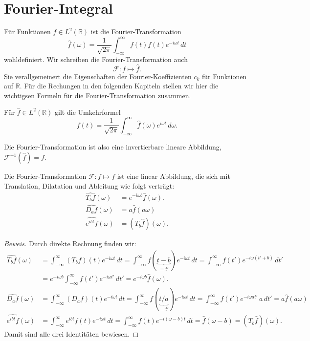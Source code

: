%
%
%
\section{Fourier-Integral
\label{section:fourier-integral}}
Für Funktionen $f\in L^2(\mathbb R)$ ist die Fourier-Transformation
\[
\hat{f}(\omega)
=
\frac{1}{\sqrt{2\pi}}
\int_{-\infty}^\infty f(t) f(t)e^{-i\omega t}\,dt
\]
wohldefiniert.
Wir schreiben die Fourier-Transformation auch
\[
\mathcal{F}\colon f\mapsto \hat{f}.
\]
Sie verallgemeinert die Eigenschaften der Fourier-Koeffizienten $c_k$
für Funktionen auf $\mathbb R$.
Für die Rechungen in den folgenden Kapiteln stellen wir hier die
wichtigsen Formeln für die Fourier-Transformation zusammen.

\begin{satz}
Für $\hat{f}\in L^2(\mathbb R)$ gilt die Umkehrformel
\[
f(t)
=
\frac{1}{\sqrt{2\pi}}
\int_{-\infty}^{\infty} \hat{f}(\omega)e^{i\omega t}\,d\omega.
\]
\end{satz}

Die Fourier-Transformation ist also eine invertierbare lineare Abbildung,
$\mathcal{F}^{-1}(\hat{f}) = f$.

\begin{satz}
Die Fourier-Transformation $\mathcal F\colon f\mapsto f$ ist eine linear
Abbildung, die sich mit Translation, Dilatation und Ableitung wie folgt
verträgt:
\begin{align*}
\widehat{T_bf}(\omega)
&=
e^{-i\omega b}\hat{f}(\omega).
\\
\widehat{D_af}(\omega)
&=
a \hat{f}(a\omega)
\\
\widehat{e^{ibt}f}(\omega)
&=
(T_b\hat{f})(\omega).
\end{align*}
\end{satz}

\begin{proof}[Beweis]
Durch direkte Rechnung finden wir:
\begin{align*}
\widehat{T_bf}(\omega)
&=
\int_{-\infty}^{\infty} (T_bf)(t)e^{-i\omega t}\,dt
=
\int_{-\infty}^{\infty} f(\underbrace{t-b}_{\displaystyle=t'})e^{-i\omega t}\,dt
=
\int_{-\infty}^{\infty} f(t')e^{-i\omega(t'+b)}\,dt'
\\
&=
e^{-i\omega b}
\int_{-\infty}^{\infty} f(t')e^{-i\omega t'}\,dt'
=
e^{-i\omega b}\hat{f}(\omega).
\\
\widehat{D_af}(\omega)
&=
\int_{-\infty}^\infty (D_af)(t)e^{-i\omega t}\,dt
=
\int_{-\infty}^\infty f(\underbrace{t/a}_{\displaystyle=t'})e^{-i\omega t}\,dt
=
\int_{-\infty}^\infty f(t')e^{-i\omega at'}\,a\,dt'
=
a \hat{f}(a\omega)
\\
\widehat{e^{ibt}f}(\omega)
&=
\int_{-\infty}^\infty e^{ibt}f(t)e^{-i\omega t}\,dt
=
\int_{-\infty}^\infty f(t)e^{-i(\omega -b)t}\,dt
=
\hat{f}(\omega-b)
=
(T_b\hat{f})(\omega).
\end{align*}
Damit sind alle drei Identitäten bewiesen.
\end{proof}


